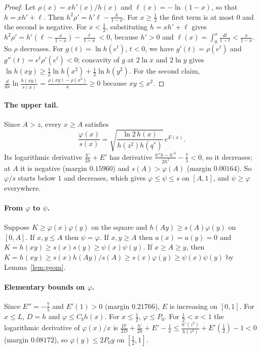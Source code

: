 \documentclass[aps,prd,twocolumn,superscriptaddress,nofootinbib,longbibliography,floatfix,amsmath,amssymb,10pt]{revtex4-2}
\theoremstyle{plain}
\theoremstyle{definition}
\theoremstyle{plain}
\newcommand{\qs}{q^{*}}
\begin{document}
\begin{proof}
Let $\rho(x)=xh'(x)/h(x)$ and $\ell(x)=-\ln(1-x)$, so that $h=xh'+\ell$. Then $h^2\rho'=h'\ell-\frac{h}{1-x}$. For $x\ge\frac12$ the first term is at most $0$ and the second is negative. For $x<\frac12$, substituting $h=xh'+\ell$ gives $h^2\rho'=h'(\ell-\frac{x}{1-x})-\frac{\ell}{1-x}<0$, because $h'>0$ and $\ell(x)=\int_0^x\frac{dt}{1-t}<\frac{x}{1-x}$. So $\rho$ decreases. For $g(t)=\ln h(e^t)$, $t<0$, we have $g'(t)=\rho(e^t)$ and $g''(t)=e^t\rho'(e^t)<0$; concavity of $g$ at $2\ln x$ and $2\ln y$ gives $\ln h(xy)\ge\frac12\ln h(x^2)+\frac12\ln h(y^2)$. For the second claim, $\frac{d}{dx}\ln\frac{h(xy)}{s(x)}=\frac{\rho(xy)-\rho(x^2)}{x}\ge 0$ because $xy\le x^2$.
\end{proof}

\paragraph*{The upper tail.} Since $A>z$, every $x\ge A$ satisfies
\[
\frac{\varphi(x)}{s(x)}=\sqrt{\frac{\ln2\,h(x)}{h(z^2)h(\qs)}}\,e^{E(x)} .
\]
Its logarithmic derivative $\frac{h'}{2h}+E'$ has derivative $\frac{h''h-h'^2}{2h^2}-\frac75<0$, so it decreases; at $A$ it is negative (margin $0.15960$) and $s(A)>\varphi(A)$ (margin $0.00164$). So $\varphi/s$ starts below $1$ and decreases, which gives $\varphi\le\psi\le s$ on $[A,1]$, and $\psi\ge\varphi$ everywhere.

\paragraph*{From $\varphi$ to $\psi$.} Suppose $K\ge\varphi(x)\varphi(y)$ on the square and $h(Ay)\ge s(A)\varphi(y)$ on $[0,A]$. If $x,y\le A$ then $\psi=\varphi$. If $x,y\ge A$ then $a(x)=a(y)=0$ and $K=h(xy)\ge s(x)s(y)\ge\psi(x)\psi(y)$. If $x\ge A\ge y$, then $K=h(xy)\ge s(x)h(Ay)/s(A)\ge s(x)\varphi(y)\ge\psi(x)\psi(y)$ by Lemma~\ref{lem:geom}.

\paragraph*{Elementary bounds on $\varphi$.} Since $E''=-\frac75$ and $E'(1)>0$ (margin $0.21766$), $E$ is increasing on $[0,1]$. For $x\le L$, $D=h$ and $\varphi\le C_bh(x)$. For $x\le\frac12$, $\varphi\le P_0$. For $\frac12<x<1$ the logarithmic derivative of $\varphi(x)/x$ is $\frac{D'}{2D}+\frac{h'}{2h}+E'-\frac1x\le\frac{h'(z^2)}{h(z^2)}+E'(\frac12)-1<0$ (margin $0.08172$), so $\varphi(y)\le 2P_0y$ on $[\frac12,1]$.
\end{document}
